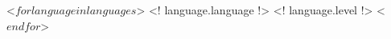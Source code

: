 
\begin{cventries}
 <$ for language in languages$>
  \cventry
    {<! language.language !> }
    {<! language.level !> }
 <$ endfor $>
\end{cventries}
